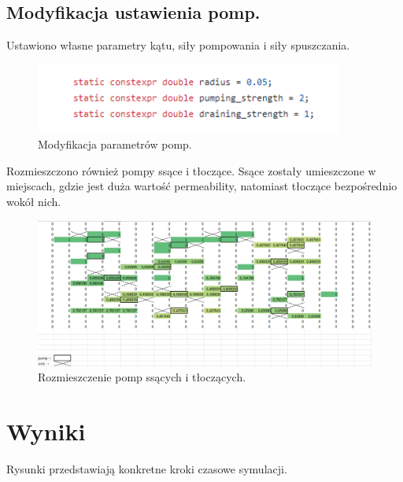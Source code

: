 \documentclass[onecolumn,12pt]{article}
\begin{document}
\subsection{Modyfikacja ustawienia pomp.}
 Ustawiono własne parametry kątu, siły pompowania i siły spuszczania.
\begin{figure}[H]
    \centering
    \includegraphics[width=0.9\textwidth]{pumps_params.png}
    \caption{Modyfikacja parametrów pomp.}
    \label{fig:example}
\end{figure}

Rozmieszczono również pompy ssące i tłoczące. Ssące zostały umieszczone w miejscach, gdzie jest duża wartość permeability, natomiast tłoczące bezpośrednio wokół nich.
\begin{figure}[H]
    \centering
    \includegraphics[width=1.0\textwidth]{pump-sink-distribution.png}
    \caption{Rozmieszczenie pomp ssących i tłoczących.}
    \label{fig:example}
\end{figure}
\section{Wyniki}

Rysunki przedstawiają konkretne kroki czasowe symulacji.
\end{document}
